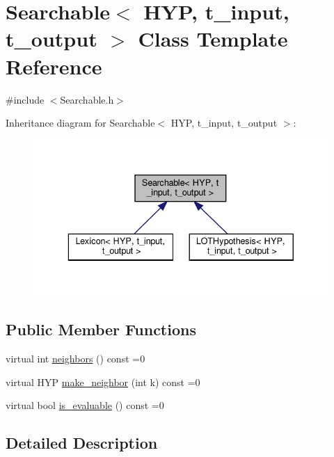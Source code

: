 \hypertarget{class_searchable}{}\section{Searchable$<$ H\+YP, t\+\_\+input, t\+\_\+output $>$ Class Template Reference}
\label{class_searchable}


{\ttfamily \#include $<$Searchable.\+h$>$}



Inheritance diagram for Searchable$<$ H\+YP, t\+\_\+input, t\+\_\+output $>$\+:\nopagebreak
\begin{figure}[H]
\begin{center}
\leavevmode
\includegraphics[width=336pt]{class_searchable__inherit__graph}
\end{center}
\end{figure}
\subsection*{Public Member Functions}
\begin{DoxyCompactItemize}
\item 
virtual int \hyperlink{class_searchable_a0450c35a21c5940a63560aa24b4ff0cc}{neighbors} () const =0
\item 
virtual H\+YP \hyperlink{class_searchable_a64bda92cc9314dae7aff31f4444a93e6}{make\+\_\+neighbor} (int k) const =0
\item 
virtual bool \hyperlink{class_searchable_aae16f1cb01f140f4033f6f67dc9753b6}{is\+\_\+evaluable} () const =0
\end{DoxyCompactItemize}


\subsection{Detailed Description}
